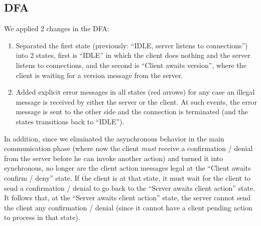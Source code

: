 \subsection{DFA}
We applied 2 changes in the DFA:
\begin{enumerate}
\item Separated the first state (previously: ``IDLE, server listens to connections'') into 2 states, first is ``IDLE'' in which the client does nothing and the server listens to connections, and the second is ``Client awaits version'', where the client is waiting for a version message from the server.
\item Added explicit error messages in all states (red arrows) for any case an illegal message is received by either the server or the client. At such events, the error message is sent to the other side and the connection is terminated (and the states transitions back to ``IDLE'').
\end{enumerate}

In addition, since we eliminated the asynchronous behavior in the main communication phase (where now the client {\em must} receive a confirmation / denial from the server before he can invoke another action) and turned it into synchronous, no longer are the client action messages legal at the ``Client awaits confirm / deny'' state. If the client is at that state, it must wait for the client to send a confirmation / denial to go back to the ``Server awaits client action'' state. It follows that, at the ``Server awaits client action'' state, the server cannot send the client any confirmation / denial (since it cannot have a client pending action to process in that state).
